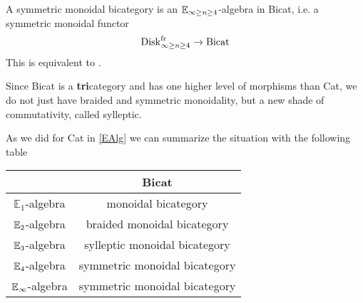 \begin{defn}\label{SymmMonBicategory}
A symmetric monoidal bicategory is an $\mathbb{E}_{\infty\geq n\geq 4}$-algebra in Bicat, i.e. a symmetric monoidal
functor
$$\operatorname{Disk}_{\infty\geq n\geq 4}^{\operatorname{fr}}\to\operatorname{Bicat}$$
This is equivalent to \cite[Theorem 2.8]{Gurski_2013}.
\end{defn}
Since Bicat is a \textbf{tri}category and has one higher level of morphisms than Cat, we do not just have
braided and symmetric
 monoidality, but a new shade of commutativity, called sylleptic.
 
As we did for Cat in \ref{EAlg} we can summarize the situation with the following table
\begin{center}
    \begin{tabular}{|c||c|}
        \hline
        \phantom{h} & Bicat \\ [0.5ex]
        \hline\hline
        $\mathbb{E}_1$-algebra & monoidal bicategory \\
        \hline
        $\mathbb{E}_2$-algebra & braided monoidal bicategory \\
        \hline
        $\mathbb{E}_3$-algebra & sylleptic monoidal bicategory \\
        \hline
        $\mathbb{E}_4$-algebra & symmetric monoidal bicategory \\
        \hline 
        $\mathbb{E}_\infty$-algebra & symmetric monoidal bicategory \\
        \hline
    \end{tabular}
\end{center}